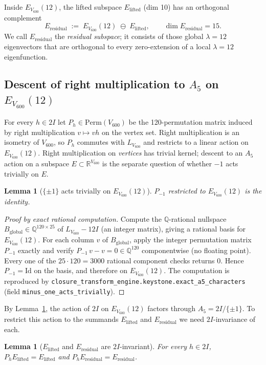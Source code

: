 \documentclass[11pt]{article}
\newcommand{\Vsix}{V_{600}}
\newcommand{\Lsix}{L_{\Vsix}}
\newcommand{\Esix}{E_{\Vsix}}
\newcommand{\Elift}{E_{\mathrm{lifted}}}
\newcommand{\Eres}{E_{\mathrm{residual}}}
\newcommand{\twoI}{2I}
\theoremstyle{plain}
\newtheorem{lemma}[theorem]{Lemma}
\theoremstyle{definition}
\begin{document}
Inside $\Esix(12)$, the lifted subspace $\Elift$ (dim 10) has an
orthogonal complement
\[
  \Eres \;:=\; \Esix(12)\;\ominus\;\Elift,\qquad \dim\Eres = 15.
\]
We call $\Eres$ the \emph{residual subspace}; it consists of those
global $\lambda{=}12$ eigenvectors that are orthogonal to every
zero-extension of a local $\lambda{=}12$ eigenfunction.

\subsection{Descent of right multiplication to $A_5$ on $\Esix(12)$}

For every $h\in\twoI$ let $P_h\in\mathrm{Perm}(\Vsix)$ be the
120-permutation matrix induced by right multiplication
$v\mapsto v h$ on the vertex set.  Right multiplication is an
isometry of $\Vsix$, so $P_h$ commutes with $\Lsix$ and restricts to
a linear action on $\Esix(12)$.  Right multiplication on
\emph{vertices} has trivial kernel; descent to an $A_5$ action on a
subspace $E\subset\mathbb{R}^{\Vsix}$ is the separate question of
whether $-1$ acts trivially on $E$.

\begin{lemma}[$\{\pm 1\}$ acts trivially on $\Esix(12)$]\label{lem:minusone}
$P_{-1}$ restricted to $\Esix(12)$ is the identity.
\end{lemma}

\begin{proof}[Proof by exact rational computation]
Compute the $\mathbb{Q}$-rational nullspace
$B_{\mathrm{global}}\in\mathbb{Q}^{120\times 25}$ of $\Lsix - 12 I$
(an integer matrix), giving a rational basis for $\Esix(12)$.  For
each column $v$ of $B_{\mathrm{global}}$, apply the integer
permutation matrix $P_{-1}$ exactly and verify
$P_{-1}\,v - v = 0 \in \mathbb{Q}^{120}$ componentwise (no
floating point).  Every one of the $25\cdot 120 = 3000$ rational
component checks returns $0$.  Hence $P_{-1} = \mathrm{Id}$ on
the basis, and therefore on $\Esix(12)$.  The computation is
reproduced by
\texttt{closure\_transform\_engine.keystone.exact\_a5\_characters}
(field \texttt{minus\_one\_acts\_trivially}).
\end{proof}

By Lemma~\ref{lem:minusone}, the action of $\twoI$ on $\Esix(12)$
factors through $A_5 = \twoI/\{\pm 1\}$.  To restrict this action to
the summands $\Elift$ and $\Eres$ we need $\twoI$-invariance of each.

\begin{lemma}[$\Elift$ and $\Eres$ are $\twoI$-invariant]\label{lem:invariance}
For every $h\in\twoI$, $P_h \Elift = \Elift$ and $P_h \Eres = \Eres$.
\end{lemma}
\end{document}
